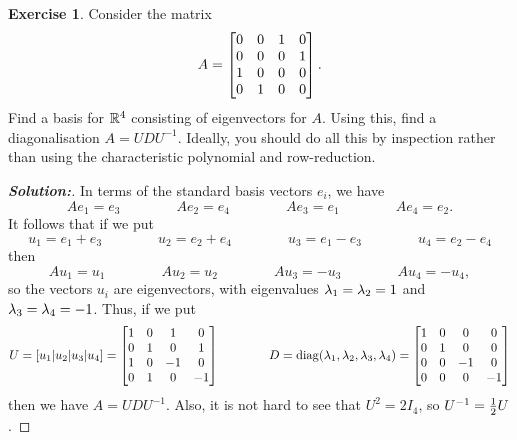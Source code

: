\documentclass[a4paper]{amsart}
\theoremstyle{definition}
\newtheorem{exercise}{Exercise}
\newenvironment{solution}{\begin{proof}[\textbf{Solution:}] \vphantom{u}}{\end{proof}}
\begin{document}
\begin{exercise}\label{ex-diagonal-iv}
 Consider the matrix
 \[ A = \left[\begin{matrix} 0&0&1&0 \\
             0&0&0&1 \\
             1&0&0&0 \\
             0&1&0&0 \end{matrix}\right].
 \]
 Find a basis for ${\mathbb{R}}^4$ consisting of eigenvectors for $A$.  Using
 this, find a diagonalisation $A=UDU^{-1}$.  Ideally, you should do
 all this by inspection rather than using the characteristic
 polynomial and row-reduction.
\end{exercise}
\begin{solution}
 In terms of the standard basis vectors $e_i$, we have
 \[ Ae_1 = e_3 \hspace{4em}
    Ae_2 = e_4 \hspace{4em}
    Ae_3 = e_1 \hspace{4em}
    Ae_4 = e_2. 
 \]
 It follows that if we put 
 \[ u_1 = e_1+e_3 \hspace{4em}
    u_2 = e_2+e_4 \hspace{4em}
    u_3 = e_1-e_3 \hspace{4em}
    u_4 = e_2-e_4 
 \]
 then
 \[ Au_1 = u_1 \hspace{4em}
    Au_2 = u_2 \hspace{4em}
    Au_3 = -u_3 \hspace{4em}
    Au_4 = -u_4,
 \]
 so the vectors $u_i$ are eigenvectors, with eigenvalues
 $\lambda_1=\lambda_2=1$ and $\lambda_3=\lambda_4=-1$.  Thus, if we put 
 \[ U = [u_1|u_2|u_3|u_4] 
      = \left[\begin{matrix}  1 &  0 &  1 &  0 \\
              0 &  1 &  0 &  1 \\
              1 &  0 & -1 &  0 \\
              0 &  1 &  0 & -1 \end{matrix}\right]
    \hspace{4em}
    D = \operatorname{diag}(\lambda_1,\lambda_2,\lambda_3,\lambda_4) 
      = \left[\begin{matrix}  1 &  0 &  0 &  0 \\
              0 &  1 &  0 &  0 \\
              0 &  0 & -1 &  0 \\
              0 &  0 &  0 & -1 \end{matrix}\right]
 \]  
 then we have $A=UDU^{-1}$.  Also, it is not hard to see that
 $U^2=2I_4$, so $U^{-1}=\tfrac{1}{2} U$.
\end{solution}
\end{document}
